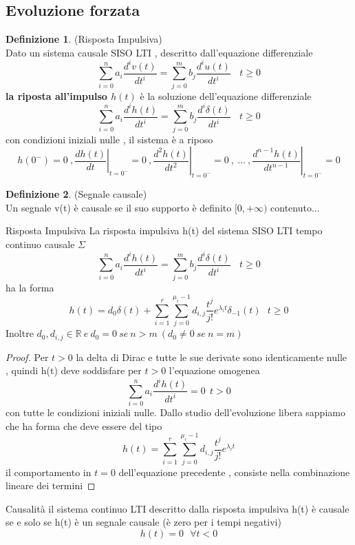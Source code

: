 \documentclass{article}
\theoremstyle{definition}
\newtheorem*{definizione}{Definizione}
\newcommand{\R}{\mathbb{R}}
\newcommand{\la}{\lambda}
\begin{document}
	\subsection{Evoluzione forzata}
	\begin{definizione}(Risposta Impulsiva)\\
		Dato un sistema causale SISO LTI , descritto dall'equazione differenziale 
		$$\sum_{i=0}^{n}a_i \frac{d^i v(t)}{dt^i}=\sum_{j=0}^{m}b_j \frac{d^i u(t)}{dt^i}  \ \ \ \ t \geq 0	$$ \textbf{la riposta all'impulso $h(t)$} è la soluzione dell'equazione differenziale   
		$$\sum_{i=0}^{n}a_i \frac{d^i h(t)}{dt^i}=\sum_{j=0}^{m}b_j \frac{d^i \delta(t)}{dt^i}  \ \ \ \ t \geq 0	$$
		con condizioni iniziali nulle , il sistema è a riposo 
		$$h\left(0^{-}\right)=0\ ,\left.\frac{d h(t)}{d t}\right|_{t=0^{-}}=0 \ ,\left.\frac{d^2 h(t)}{d t^2}\right|_{t=0^{-}}=0\ ,\  \ldots \ ,\left.\frac{d^{n-1} h(t)}{d t^{n-1}}\right|_{t=0^{-}}=0
		$$ 
	\end{definizione}
	\begin{definizione}(Segnale causale)\\
		Un segnale v(t) è causale se il suo supporto  è definito $[0,+\infty )$
		contenuto...
	\end{definizione}
	\begin{teo}{Risposta Impulsiva}{}{}
		La risposta impulsiva h(t) del sistema SISO LTI tempo continuo causale  $\Sigma$
		$$\sum_{i=0}^{n}a_i \frac{d^i h(t)}{dt^i}=\sum_{j=0}^{m}b_j \frac{d^i \delta(t)}{dt^i}  \ \ \ \ t \geq 0	$$
		ha la forma 
		$$h(t)=d_0 \delta(t)+\sum_{i=1}^{r}\sum_{j=0}^{\mu_i-1}d_{i,j}\frac{t^j}{j!}e^{\la_i t}\delta_{-1}(t) \ \ \ t \geq 0$$
		Inoltre $d_0 , d_{i,j} \in \R \ e \ d_0=0 \ se \ n > m \ (d_0\neq 0 \ se \ n=m)$
	\end{teo}
	\begin{proof}
		Per $t>0$ la delta di Dirac e tutte le sue derivate sono identicamente nulle , quindi h(t) deve soddisfare per $t >0$ l'equazione omogenea 
		$$\sum_{i=0}^n a_i \frac{d^i h(t)}{dt^i}=0 \ \ t > 0$$ con tutte le condizioni iniziali nulle. Dallo studio dell'evoluzione libera sappiamo che ha forma che deve essere del tipo 
		$$h(t)=\sum_{i=1}^{r}\sum_{j=0}^{\mu_i-1}d_{i,j}\frac{t^j}{j!}e^{\la_i t}$$ il comportamento in $t=0$ dell'equazione precedente , consiste nella combinazione lineare dei termini 
	\end{proof}
	\begin{teo}{Causalità}{}
	il sistema continuo LTI descritto dalla risposta impulsiva h(t) è causale se e solo se h(t) è un segnale causale (è zero per i tempi negativi) $$h(t)=0 \ \ \  \forall t < 0$$
	\end{teo}
\end{document}
